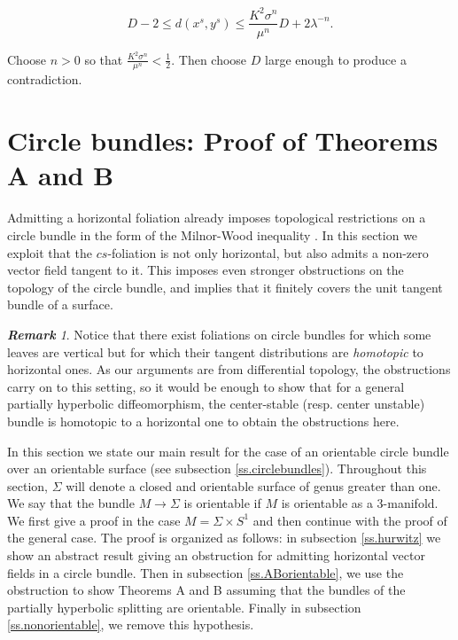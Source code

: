 \documentclass[11pt]{amsart} %
\numberwithin{equation}{section}
\theoremstyle{remark}
\newtheorem*{remark} {\textbf{Remark}}
\begin{document}
$$ D-2 \leq d(x^s,y^s) \leq \frac{K^2 \sigma^n}{\mu^n} D + 2 \lambda^{-n}. $$

Choose $n>0$ so that $\frac{K^2 \sigma^n}{\mu^n} < \frac{1}{2}$.
Then choose $D$ large enough to produce a contradiction. 


%
\section{Circle bundles: Proof of Theorems A and B}\label{s.proofCircle} 


Admitting a horizontal foliation already imposes topological restrictions on a circle bundle in the form of the Milnor-Wood inequality \cite[Book II, Chapter 4]{CandelConlon}.
In this section we exploit that the $cs$-foliation is not only horizontal, but
also admits a non-zero vector field tangent to it.
This imposes even stronger obstructions on the topology of the circle bundle,
and implies that it finitely covers the unit tangent bundle of a surface.

\begin{remark}\label{rem-jonathanbowden}
Notice that there exist foliations on circle bundles for which some leaves are vertical but for which their tangent distributions are \emph{homotopic} to horizontal ones. As our arguments are from differential topology, the obstructions carry on to this setting, so it would be enough to show that for a general partially hyperbolic diffeomorphism, the center-stable (resp. center unstable) bundle is homotopic to a horizontal one to obtain the obstructions here. %
\end{remark}

In this section we state our main result for the case of an orientable circle bundle over an orientable surface (see subsection \ref{ss.circlebundles}). Throughout this section, $\Sigma$ will denote a closed and orientable surface of genus greater than one. We say that the bundle $M\rightarrow\Sigma$ is orientable if $M$ is orientable as a 3-manifold. We first give a proof in the case $M=\Sigma \times S^1$ and then continue with the proof of the general case. The proof is organized as follows: in subsection \ref{ss.hurwitz} we show an abstract result giving an obstruction for admitting horizontal vector fields in a circle bundle. Then in subsection \ref{ss.ABorientable}, we use the obstruction to show Theorems A and B assuming that the bundles of the partially hyperbolic splitting are orientable. Finally in subsection \ref{ss.nonorientable}, we remove this hypothesis.%
\end{document}
